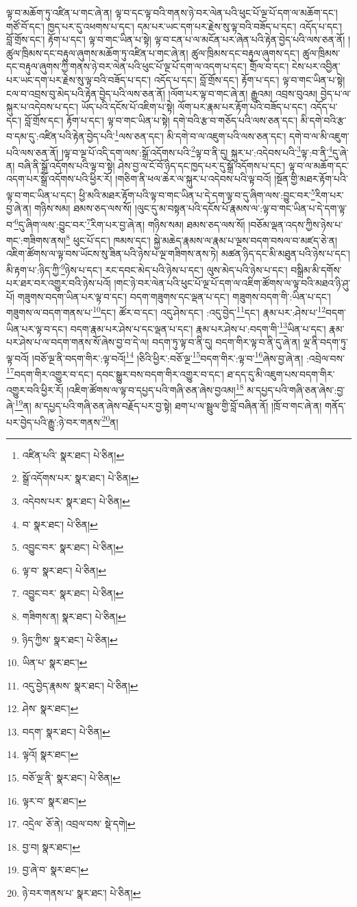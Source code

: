 ལྟ་བ་མཆོག་ཏུ་འཛིན་པ་གང་ཞེ་ན། ལྟ་བ་དང་ལྟ་བའི་གནས་ཉེ་བར་ལེན་པའི་ཕུང་པོ་ལྔ་པོ་དག་ལ་མཆོག་དང་། གཙོ་བོ་དང་། ཁྱད་པར་དུ་འཕགས་པ་དང་། དམ་པར་ཡང་དག་པར་རྗེས་སུ་ལྟ་བའི་བཟོད་པ་དང་། འདོད་པ་དང་། བློ་གྲོས་དང་། རྟོག་པ་དང་། ལྟ་བ་གང་ཡིན་པ་སྟེ། ལྟ་བ་ངན་པ་ལ་མངོན་པར་ཞེན་པའི་རྟེན་བྱེད་པའི་ལས་ཅན་ནོ། །ཚུལ་ཁྲིམས་དང་བརྟུལ་ཞུགས་མཆོག་ཏུ་འཛིན་པ་གང་ཞེ་ན། ཚུལ་ཁྲིམས་དང་བརྟུལ་ཞུགས་དང་། ཚུལ་ཁྲིམས་དང་བརྟུལ་ཞུགས་ཀྱི་གནས་ཉེ་བར་ལེན་པའི་ཕུང་པོ་ལྔ་པོ་དག་ལ་འདག་པ་དང་། གྲོལ་བ་དང་། ངེས་པར་འབྱིན་པར་ཡང་དག་པར་རྗེས་སུ་ལྟ་བའི་བཟོད་པ་དང་། འདོད་པ་དང་། བློ་གྲོས་དང་། རྟོག་པ་དང་། ལྟ་བ་གང་ཡིན་པ་སྟེ། ངལ་བ་འབྲས་བུ་མེད་པའི་རྟེན་བྱེད་པའི་ལས་ཅན་ནོ། །ལོག་པར་ལྟ་བ་གང་ཞེ་ན། རྒྱུའམ། འབྲས་བུའམ། བྱེད་པ་ལ་སྐུར་པ་འདེབས་པ་དང་། ཡོད་པའི་དངོས་པོ་འཇིག་པ་སྟེ། ལོག་པར་རྣམ་པར་རྟོག་པའི་བཟོད་པ་དང་། འདོད་པ་དང་། བློ་གྲོས་དང་། རྟོག་པ་དང་། ལྟ་བ་གང་ཡིན་པ་སྟེ། དགེ་བའི་རྩ་བ་གཅོད་པའི་ལས་ཅན་དང་། མི་དགེ་བའི་རྩ་བ་དམ་དུ་:འཛིན་པའི་རྟེན་བྱེད་པའི་\footnote{འཛིན་པའི་  སྣར་ཐང་།  པེ་ཅིན། }ལས་ཅན་དང་། མི་དགེ་བ་ལ་འཇུག་པའི་ལས་ཅན་དང་། དགེ་བ་ལ་མི་འཇུག་པའི་ལས་ཅན་ནོ། །ལྟ་བ་ལྔ་པོ་འདི་དག་ལས་:སྒྲོ་འདོགས་པའི་\footnote{སྒྲོ་འདོགས་པར་  སྣར་ཐང་།  པེ་ཅིན། }ལྟ་བ་ནི་དུ། སྐུར་པ་:འདེབས་པའི་\footnote{འདེབས་པར་  སྣར་ཐང་།  པེ་ཅིན། }ལྟ་:བ་ནི་\footnote{བ་  སྣར་ཐང་།  པེ་ཅིན། }དུ་ཞེ་ན། བཞི་ནི་སྒྲོ་འདོགས་པའི་ལྟ་བ་སྟེ། ཤེས་བྱ་ལ་ངོ་བོ་ཉིད་དང་ཁྱད་པར་དུ་སྒྲོ་འདོགས་པ་དང་། ལྟ་བ་ལ་མཆོག་དང་འདག་པར་སྒྲོ་འདོགས་པའི་ཕྱིར་རོ། །གཅིག་ནི་ཕལ་ཆེར་ལ་སྐུར་པ་འདེབས་པའི་ལྟ་བའོ། །སྔོན་གྱི་མཐར་རྟོག་པའི་ལྟ་བ་གང་ཡིན་པ་དང་། ཕྱི་མའི་མཐར་རྟོག་པའི་ལྟ་བ་གང་ཡིན་པ་དེ་དག་ལྟ་བ་དུ་ཞིག་ལས་:བྱུང་བར་\footnote{འབྱུང་བར་  སྣར་ཐང་།  པེ་ཅིན། }རིག་པར་བྱ་ཞེ་ན། གཉིས་སམ། ཐམས་ཅད་ལས་སོ། །ལུང་དུ་མ་བསྟན་པའི་དངོས་པོ་རྣམས་ལ་:ལྟ་བ་གང་ཡིན་པ་དེ་དག་ལྟ་བ་\footnote{ལྟ་བ་  སྣར་ཐང་།  པེ་ཅིན། }དུ་ཞིག་ལས་:བྱུང་བར་\footnote{འབྱུང་བར་  སྣར་ཐང་།  པེ་ཅིན། }རིག་པར་བྱ་ཞེ་ན། གཉིས་སམ། ཐམས་ཅད་ལས་སོ། །བཅོམ་ལྡན་འདས་ཀྱིས་ཉེས་པ་གང་:གཟིགས་ནས།\footnote{གཟིགས་ན།  སྣར་ཐང་།  པེ་ཅིན། } ཕུང་པོ་དང་། ཁམས་དང་། སྐྱེ་མཆེད་རྣམས་ལ་རྣམ་པ་ལྔས་བདག་བསལ་བ་མཛད་ཅེ་ན། འཇིག་ཚོགས་ལ་ལྟ་བས་ཡོངས་སུ་ཟིན་པའི་ཉེས་པ་ལྔ་གཟིགས་ནས་ཏེ། མཚན་ཉིད་དང་མི་མཐུན་པའི་ཉེས་པ་དང་། མི་རྟག་པ་:ཉིད་ཀྱི་\footnote{ཉིད་ཀྱིས་  སྣར་ཐང་།  པེ་ཅིན། }ཉེས་པ་དང་། རང་དབང་མེད་པའི་ཉེས་པ་དང་། ལུས་མེད་པའི་ཉེས་པ་དང་། བསྒྲིམ་མི་དགོས་པར་ཐར་བར་འགྱུར་བའི་ཉེས་པའོ། །གང་ཉེ་བར་ལེན་པའི་ཕུང་པོ་ལྔ་པོ་དག་ལ་འཇིག་ཚོགས་ལ་ལྟ་བའི་མཐའ་ཉི་ཤུ་པོ། གཟུགས་བདག་ཡིན་པར་ལྟ་བ་དང་། བདག་གཟུགས་དང་ལྡན་པ་དང་། གཟུགས་བདག་གི་:ཡིན་པ་དང་།གཟུགས་ལ་བདག་གནས་པ་\footnote{ཡིན་པ་  སྣར་ཐང་། }དང་། ཚོར་བ་དང་། འདུ་ཤེས་དང་། :འདུ་བྱེད་\footnote{འདུ་བྱེད་རྣམས་  སྣར་ཐང་།  པེ་ཅིན། }དང་། རྣམ་པར་:ཤེས་པ་\footnote{ཤེས་  སྣར་ཐང་། }བདག་ཡིན་པར་ལྟ་བ་དང་། བདག་རྣམ་པར་ཤེས་པ་དང་ལྡན་པ་དང་། རྣམ་པར་ཤེས་པ་:བདག་གི་\footnote{བདག་  སྣར་ཐང་།  པེ་ཅིན། }ཡིན་པ་དང་། རྣམ་པར་ཤེས་པ་ལ་བདག་གནས་སོ་ཞེས་བྱ་བ་དེ་ལ། བདག་ཏུ་ལྟ་བ་ནི་དུ། བདག་གིར་ལྟ་བ་ནི་དུ་ཞེ་ན། ལྔ་ནི་བདག་ཏུ་ལྟ་བའོ། །བཅོ་ལྔ་ནི་བདག་གིར་:ལྟ་བའོ།\footnote{ལྟའོ།  སྣར་ཐང་། } །ཅིའི་ཕྱིར་:བཅོ་ལྔ་\footnote{བཅོ་ལྔ་ནི་  སྣར་ཐང་།  པེ་ཅིན། }བདག་གིར་:ལྟ་བ་\footnote{ལྟར་བ་  སྣར་ཐང་། }ཞེས་བྱ་ཞེ་ན། :འབྲེལ་བས་\footnote{འདྲེལ་  ཅོ་ནེ། འབྲལ་བས་  སྡེ་དགེ། }བདག་གིར་འགྱུར་བ་དང་། དབང་སྒྱུར་བས་བདག་གིར་འགྱུར་བ་དང་། ཐ་དད་དུ་མི་འཇུག་པས་བདག་གིར་འགྱུར་བའི་ཕྱིར་རོ། །འཇིག་ཚོགས་ལ་ལྟ་བ་དཔྱད་པའི་གཞི་ཅན་ཞེས་བྱའམ།\footnote{བྱ་བ།  སྣར་ཐང་། } མ་དཔྱད་པའི་གཞི་ཅན་ཞེས་:བྱ་ཞེ་\footnote{བྱ་ཞེ་བ་  སྣར་ཐང་། }ན། མ་དཔྱད་པའི་གཞི་ཅན་ཞེས་བརྗོད་པར་བྱ་སྟེ། ཐག་པ་ལ་སྦྲུལ་གྱི་བློ་བཞིན་ནོ། །ཁྲོ་བ་གང་ཞེ་ན། གནོད་པར་བྱེད་པའི་རྒྱུ་:ཉེ་བར་གནས་\footnote{ཉེ་བར་གནས་པ་  སྣར་ཐང་།  པེ་ཅིན། }ན། 